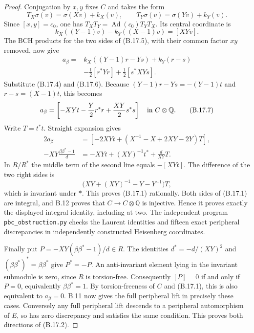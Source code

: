\begin{proof}
Conjugation by $x,y$ fixes $C$ and takes the form
\[
 T_X\sigma(v)=\sigma(Xv)+k_X(v),\qquad
 T_Y\sigma(v)=\sigma(Yv)+k_Y(v).
\]
Since $[x,y]=c_0$, one has
$T_XT_Y=\operatorname{Ad}(c_0)T_YT_X$. Its central coordinate is
\[
 k_X((Y-1)v)-k_Y((X-1)v)=[XYv].
 \tag{B.17.6}
\]
The BCH products for the two sides of (B.17.5), with their common
factor $xy$ removed, now give
\[
\begin{split}
 a_\beta={}&k_X((Y-1)r-Ys)+k_Y(r-s)\\
           &-\tfrac12[r^*Yr]+\tfrac12[s^*XYs].
\end{split}
\]
Substitute (B.17.4) and (B.17.6). Because
$(Y-1)r-Ys=-(Y-1)t$ and $r-s=(X-1)t$, this becomes
\[
 a_\beta=
       \left[-XYt-\frac Y2 r^*r+\frac{XY}{2}s^*s\right]
       \quad\hbox{in }C\otimes\mathbb Q.
 \tag{B.17.7}
\]
Write $T=t^*t$. Straight expansion gives
\[
\begin{split}
 2a_\beta
   &=\left[-2XYt+(X^{-1}-X+2XY-2Y)T\right],\\
 -XY\frac{\beta\beta^*-1}{d}
   &=-XYt+(XY)^{-1}t^*+\frac d{XY}T.
\end{split}
\]
In $R/R^*$ the middle term of the second line equals
$-[XYt]$. The difference of the two right sides is
\[
       \bigl(XY+(XY)^{-1}-Y-Y^{-1}\bigr)T,
\]
which is invariant under $*$. This proves (B.17.1) rationally.
Both sides of (B.17.1) are integral, and B.12 proves that
$C\to C\otimes\mathbb Q$ is injective. Hence it proves exactly
the displayed integral identity, including at two.
The independent program \texttt{pbc\_obstruction.py} checks the
Laurent identities and fifteen exact peripheral discrepancies in
independently constructed Heisenberg coordinates.

Finally put $P=-XY(\beta\beta^*-1)/d\in R$.
The identities $d^*=-d/(XY)^2$ and
$(\beta\beta^*)^*=\beta\beta^*$ give $P^*=-P$.
An anti-invariant element lying in the invariant submodule is
zero, since $R$ is torsion-free. Consequently
$[P]=0$ if and only if $P=0$, equivalently
$\beta\beta^*=1$. By torsion-freeness of $C$ and (B.17.1),
this is also equivalent to $a_\beta=0$.
B.11 now gives the full peripheral lift in precisely these cases.
Conversely any full peripheral lift descends to a peripheral
automorphism of $E$, so has zero discrepancy and satisfies the
same condition. This proves both directions of (B.17.2).
\end{proof}

